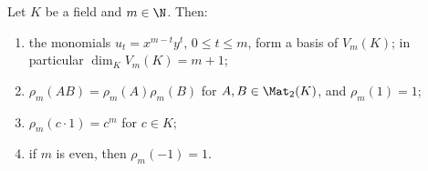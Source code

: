 Let $K$ be a field and $m\in\N$. Then:
\begin{enumerate}[label=(\alph*)]
\item the monomials $u_t=x^{m-t}y^t$, $0\le t\le m$, form a basis of $V_m(K)$; in particular $\dim_KV_m(K)=m+1$;
\item $\rho_m(AB)=\rho_m(A)\rho_m(B)$ for $A,B\in\Mat_2(K)$, and $\rho_m(1)=1$;
\item $\rho_m(c\cdot1)=c^m$ for $c\in K$;
\item if $m$ is even, then $\rho_m(-1)=1$.
\end{enumerate}
